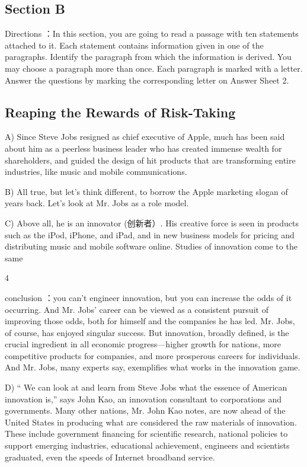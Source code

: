 \documentclass[UTF8,11pt]{ctexart}
\begin{document}
\subsection*{\textbf{Section B}}


Directions ：In this section, you are going to read a passage with ten statements attached to it. Each statement contains information given in one of the paragraphs. Identify the paragraph from which the information is derived. You may choose a paragraph more than once. Each paragraph is marked with a letter. Answer the questions by marking the corresponding letter on Answer Sheet 2.


\subsection*{\textbf{Reaping the Rewards of Risk-Taking}}


A) Since Steve Jobs resigned as chief executive of Apple, much has been said about him as a peerless business leader who has created immense wealth for shareholders, and guided the design of hit products that are transforming entire industries, like music and mobile communications.


B) All true, but let’s think different, to borrow the Apple marketing slogan of years back. Let’s look at Mr. Jobs as a role model.


C) Above all, he is an innovator (创新者）. His creative force is seen in products such as the iPod, iPhone, and iPad, and in new business models for pricing and distributing music and mobile software online. Studies of innovation come to the same


4


conclusion ：you can’t engineer innovation, but you can increase the odds of it occurring. And Mr. Jobs’ career can be viewed as a consistent pursuit of improving those odds, both for himself and the companies he has led. Mr. Jobs, of course, has enjoyed singular success. But innovation, broadly defined, is the crucial ingredient in all economic progress—higher growth for nations, more competitive products for companies, and more prosperous careers for individuals. And Mr. Jobs, many experts say, exemplifies what works in the innovation game.


D) “ We can look at and learn from Steve Jobs what the essence of American innovation is,” says John Kao, an innovation consultant to corporations and governments. Many other nations, Mr. John Kao notes, are now ahead of the United States in producing what are considered the raw materials of innovation. These include government financing for scientific research, national policies to support emerging industries, educational achievement, engineers and scientists graduated, even the speeds of Internet broadband service.
\end{document}
